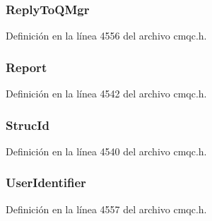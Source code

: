 \hypertarget{structtag_m_q_m_d1_a9364487d587c0a06d95c25d1ae05a0be}{}
\subsubsection[{Reply\+To\+Q\+Mgr}]{ Reply\+To\+Q\+Mgr}\label{structtag_m_q_m_d1_a9364487d587c0a06d95c25d1ae05a0be}


Definición en la línea 4556 del archivo cmqc.\+h.

\hypertarget{structtag_m_q_m_d1_a3e6ae3e2f087fe6fc26cc75004fbc790}{}
\subsubsection[{Report}]{ Report}\label{structtag_m_q_m_d1_a3e6ae3e2f087fe6fc26cc75004fbc790}


Definición en la línea 4542 del archivo cmqc.\+h.

\hypertarget{structtag_m_q_m_d1_a0530922ca944569b52601d74941f96e4}{}
\subsubsection[{Struc\+Id}]{ Struc\+Id}\label{structtag_m_q_m_d1_a0530922ca944569b52601d74941f96e4}


Definición en la línea 4540 del archivo cmqc.\+h.

\hypertarget{structtag_m_q_m_d1_a46cc458e507d74cea87ed00b97695f65}{}
\subsubsection[{User\+Identifier}]{ User\+Identifier}\label{structtag_m_q_m_d1_a46cc458e507d74cea87ed00b97695f65}


Definición en la línea 4557 del archivo cmqc.\+h.

